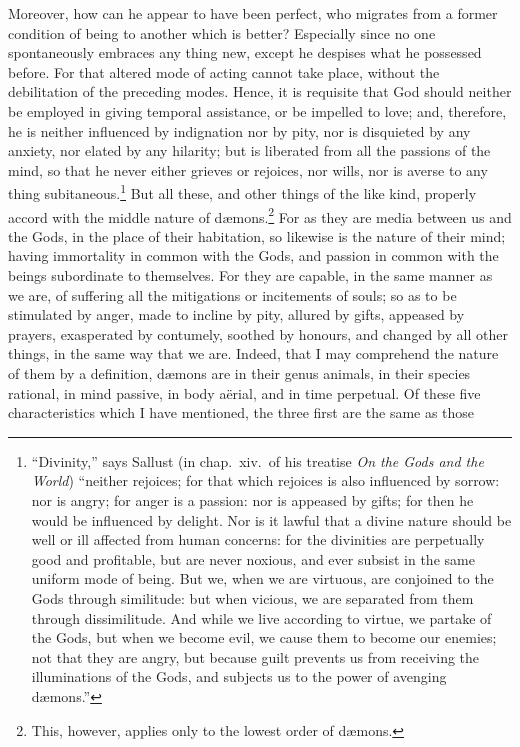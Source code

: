 \documentclass{article}
\begin{document}
Moreover, how can he appear to have been perfect, who migrates from a former
condition of being to another which is better? Especially since no one
spontaneously embraces any thing new, except he despises what he possessed
before. For that altered mode of acting cannot take place, without the
debilitation of the preceding modes. Hence, it is requisite that God should
neither be employed in giving temporal assistance, or be impelled to love; and,
therefore, he is neither influenced by indignation nor by pity, nor is
disquieted by any anxiety, nor elated by any hilarity; but is liberated from
all the passions of the mind, so that he never either grieves or rejoices, nor
wills, nor is averse to any thing subitaneous.\footnote{``Divinity,'' says
Sallust (in chap.~xiv.~of his treatise \textit{On the Gods and the World})
``neither rejoices; for that which rejoices is also influenced by sorrow: nor
is angry; for anger is a passion: nor is appeased by gifts; for then he would
be influenced by delight. Nor is it lawful that a divine nature should be well
or ill affected from human concerns: for the divinities are perpetually good
and profitable, but are never noxious, and ever subsist in the same uniform
mode of being. But we, when we are virtuous, are conjoined to the Gods through
similitude: but when vicious, we are separated from them through dissimilitude.
And while we live according to virtue, we partake of the Gods, but when we
become evil, we cause them to become our enemies; not that they are angry, but
because guilt prevents us from receiving the illuminations of the Gods, and
subjects us to the power of avenging d{\ae}mons.''} But all these, and other
things of the like kind, properly accord with the middle nature of
d{\ae}mons.\footnote{This, however, applies only to the lowest order of
d{\ae}mons.} For as they are media between us and the Gods, in the place of
their habitation, so likewise is the nature of their mind; having immortality
in common with the Gods, and passion in common with the beings subordinate to
themselves.  For they are capable, in the same manner as we are, of suffering
all the mitigations or incitements of souls; so as to be stimulated by anger,
made to incline by pity, allured by gifts, appeased by prayers, exasperated by
contumely, soothed by honours, and changed by all other things, in the same way
that we are. Indeed, that I may comprehend the nature of them by a definition,
d{\ae}mons are in their genus animals, in their species rational, in mind
passive, in body a\"{e}rial, and in time perpetual. Of these five
characteristics which I have mentioned, the three first are the same as those
\end{document}
